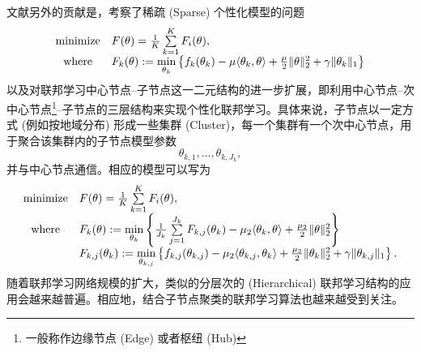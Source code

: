 文献\parencite{li2021pfedmac}另外的贡献是，考察了稀疏 (Sparse) 个性化模型的问题
\begin{equation}
\label{eq:pfedmac-sparse}
\begin{array}{cl}
\operatorname*{minimize} & F(\theta) = \frac{1}{K} \sum\limits_{k=1}^K F_i(\theta), \\
\text{where} & F_k(\theta) := \mathop{\rm min}\limits_{\theta_k} \left\{ f_k(\theta_k) - \mu \langle \theta_k, \theta \rangle + \frac{\mu}{2} \lVert \theta \rVert^2_2 + \gamma \lVert \theta_k \rVert_1 \right\}
\end{array}
\end{equation}
以及对联邦学习中心节点--子节点这一二元结构的进一步扩展，即利用中心节点--次中心节点\footnote{一般称作边缘节点 (Edge)\cite{Liu_2020_Hierarchical} 或者枢纽 (Hub)\cite{proxskip-vr}}--子节点的三层结构\cite{Liu_2020_Hierarchical}来实现个性化联邦学习。具体来说，子节点以一定方式 (例如按地域分布) 形成一些集群 (Cluster)，每一个集群有一个次中心节点，用于聚合该集群内的子节点模型参数
\begin{equation*}
\theta_{k,1}, \ldots, \theta_{k, J_k},
\end{equation*}
并与中心节点通信。相应的模型可以写为
\begin{equation}
\label{eq:pfedmac-sh}
\begin{array}{cl}
\operatorname*{minimize} & F(\theta) = \frac{1}{K} \sum\limits_{k=1}^K F_i(\theta), \\
\text{where} & F_k(\theta) := \mathop{\rm min}\limits_{\theta_k} \left\{ \frac{1}{J_k} \sum\limits_{j=1}^{J_k} F_{k, j} (\theta_k) - \mu_2 \langle \theta_k, \theta \rangle + \frac{\mu_2}{2} \lVert \theta \rVert^2_2 \right\} \\
& F_{k, j}(\theta_k) := \mathop{\rm min}\limits_{\theta_{k, j}} \left\{ f_{k, j} (\theta_{k, j}) - \mu_2 \langle \theta_{k, j}, \theta_k \rangle + \frac{\mu_2}{2} \lVert \theta_k \rVert^2_2 + \gamma \lVert \theta_{k, j} \rVert_1 \right\}.
\end{array}
\end{equation}
随着联邦学习网络规模的扩大，类似的分层次的 (Hierarchical) 联邦学习结构的应用会越来越普遍。相应地，结合子节点聚类的联邦学习算法也越来越受到关注\cite{Sattler_2021_cfl, Ghosh_2022_cfl, Yu_2024_FPFC, Zhang_2023_fedmds}。

